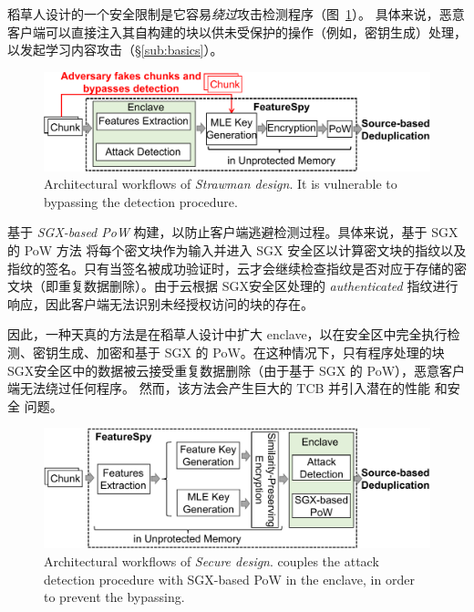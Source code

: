 稻草人设计的一个安全限制是它容易{\em 绕过}攻击检测程序（图~\ref{fig:architecture-strawman}）。 具体来说，恶意客户端可以直接注入其自构建的块以供未受保护的操作（例如，密钥生成）处理，以发起学习内容攻击（\S\ref{sub:basics}）。


\begin{figure}
  \centering
  \includegraphics[width=\textwidth]{pic/featurespy/naive.pdf}
  \caption{Architectural workflows of \textit{Strawman design}. It is vulnerable to bypassing the detection procedure.}
  \label{fig:architecture-strawman}
\end{figure}

\sysnameF 基于 {\em SGX-based PoW} \cite{ren21} 构建，以防止客户端逃避检测过程。具体来说，基于 SGX 的 PoW 方法 \cite{ren21} 将每个密文块作为输入并进入 SGX 安全区以计算密文块的指纹以及指纹的签名。只有当签名被成功验证时，云才会继续检查指纹是否对应于存储的密文块（即重复数据删除）。由于云根据 SGX安全区处理的 {\em authenticated} 指纹进行响应，因此客户端无法识别未经授权访问的块的存在。

因此，一种天真的方法是在稻草人设计中扩大 enclave，以在安全区中完全执行检测、密钥生成、加密和基于 SGX 的 PoW。在这种情况下，只有程序处理的块SGX安全区中的数据被云接受重复数据删除（由于基于 SGX 的 PoW），恶意客户端无法绕过任何程序。
然而，该方法会产生巨大的 TCB 并引入潜在的性能 \cite{arnautov16, harnik18, dinhngoc19} 和安全 \cite{lie05} 问题。

\begin{figure}
  \centering
  \includegraphics[width=\textwidth]{pic/featurespy/architecture.pdf}
  \caption{Architectural workflows of \textit{Secure design}. \sysnameF couples the attack detection procedure with SGX-based PoW \cite{ren21} in the enclave, in order to prevent the bypassing.}
  \label{fig:architecture-secure}
\end{figure}

